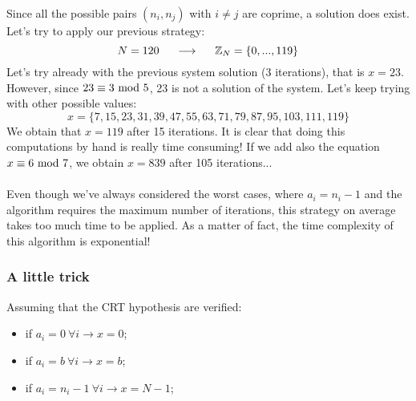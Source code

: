 Since all the possible pairs $(n_i,n_j)$ with $i\ne j$ are coprime, a solution does exist. Let's try to apply our previous strategy:
$$N=120\hspace{0.5cm}\longrightarrow\hspace{0.5cm}\mathbb{Z}_N=\{0,...,119\}$$
Let's try already with the previous system solution (3 iterations), that is $x=23$. However, since ${23\equiv3\text{ mod }5}$, 23 is not a solution of the system. Let's keep trying with other possible values:
$$x=\{7,15,23,31,39,47,55,63,71,79,87,95,103,111,119\}$$
We obtain that $x=119$ after 15 iterations. It is clear that doing this computations by hand is really time consuming! If we add also the equation $x\equiv6\text{ mod }7$, we obtain $x=839$ after 105 iterations...\\\\
Even though we've always considered the worst cases, where $a_i=n_i-1$ and the algorithm requires the maximum number of iterations, this strategy on average takes too much time to be applied. As a matter of fact, the time complexity of this algorithm is exponential!

\subsubsection*{A little trick}
Assuming that the CRT hypothesis are verified:
\begin{itemize}
    \item if $a_i=0\ \forall i\rightarrow x=0$;
    \item if $a_i=b\ \forall i\rightarrow x=b$;
    \item if $a_i=n_i-1\ \forall i\rightarrow x=N-1$;
\end{itemize}

\newpage
